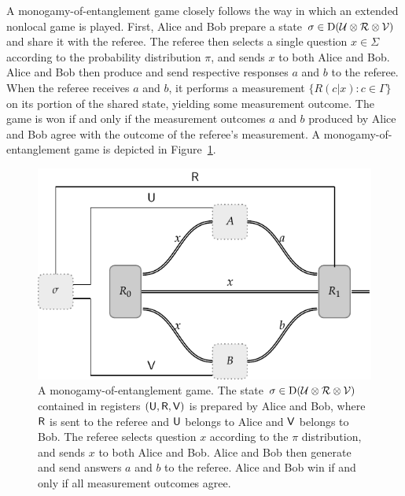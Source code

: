 A monogamy-of-entanglement game closely follows the way in which an extended nonlocal game is played. First, Alice and Bob prepare a state $\sigma \in \mathrm{D}(\mathcal{U} \otimes \mathcal{R} \otimes \mathcal{V})$ and share it with the referee. The referee then selects a single question $x \in \Sigma$ according to the probability distribution $\pi$, and sends $x$ to both Alice and Bob. Alice and Bob then produce and send respective responses $a$ and $b$ to the referee. When the referee receives $a$ and $b$, it performs a measurement $\{R(c|x) : c \in \Gamma\}$ on its portion of the shared state, yielding some measurement outcome. The game is won if and only if the measurement outcomes $a$ and $b$ produced by Alice and Bob agree with the outcome of the referee's measurement. A monogamy-of-entanglement game is depicted in Figure~\ref{fig:monogamy-game}. 
\begin{figure}[!htpb] 
	\begin{center}
		\includegraphics[scale=0.9]{figures/moe_2.pdf}
	\end{center}
		\caption[A monogamy-of-entanglement game.]{A monogamy-of-entanglement game. The state $\sigma \in \mathrm{D}(\mathcal{U} \otimes \mathcal{R} \otimes \mathcal{V})$ contained in registers $(\mathsf{U},\mathsf{R},\mathsf{V})$ is prepared by Alice and Bob, where $\mathsf{R}$ is sent to the referee and $\mathsf{U}$ belongs to Alice and $\mathsf{V}$ belongs to Bob. The referee selects question $x$ according to the $\pi$ distribution, and sends $x$ to both Alice and Bob. Alice and Bob then generate and send answers $a$ and $b$ to the referee. Alice and Bob win if and only if all measurement outcomes agree. }
		\label{fig:monogamy-game}
\end{figure}

